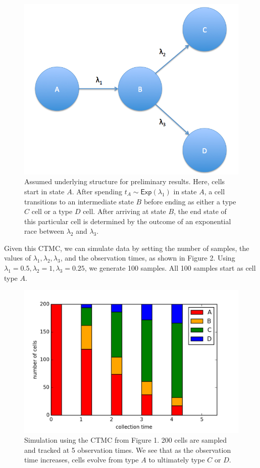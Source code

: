 \documentclass[11pt,onecolumn]{article}
\begin{document}
\begin{figure}[!htb]
		\captionsetup{width=.8\linewidth}
		\caption{Assumed underlying structure for preliminary results. Here, cells start in state $A$. After spending $t_A \sim \textsf{Exp}(\lambda_1) $ in state $A$, a cell transitions to an intermediate state $B$ before ending as either a type $C$ cell or a type $D$ cell. After arriving at state $B$, the end state of this particular cell is determined by the outcome of an exponential race between $\lambda_2$ and $\lambda_3$.}
		\centering
		\includegraphics[scale=0.3]{Fig1.png}
\end{figure}

Given this CTMC, we can simulate data by setting the number of samples, the values of $\lambda_1, \lambda_2, \lambda_3$, and the observation times, as shown in Figure 2. Using $\lambda_1 = 0.5, \lambda_2 = 1, \lambda_3 = 0.25$, we generate 100 samples. All 100 samples start as cell type $A$.

\begin{figure}[!htb]
		\captionsetup{width=.8\linewidth}
		\caption{Simulation using the CTMC from Figure 1. 200 cells are sampled and tracked at 5 observation times. We see that as the observation time increases, cells evolve from type $A$ to ultimately type $C$ or $D$.}
		\centering
		\includegraphics[scale=0.65]{Fig2.png}
\end{figure}
\end{document}
